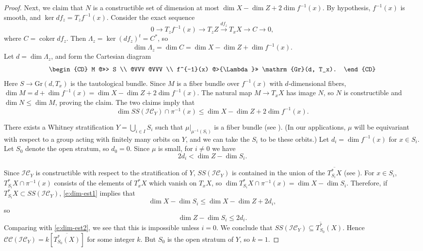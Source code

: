 \documentclass[11pt,letterpaper,reqno]{amsart}
\newcommand{\coker}{\operatorname{coker}}
\newcommand{\cC}{\mathcal C}
\newcommand{\cI}{\mathcal I}
\newcommand{\IC}{\cI \cC}
\newcommand{\CC}{\cC \cC}
\numberwithin{equation}{section}
\theoremstyle{plain}
\theoremstyle{definition}
\theoremstyle{remark}
\begin{document}
\begin{proof}
Next, we claim that  $N$ is a constructible set of dimension at most
$ \dim X - \dim Z + 2 \dim f^{-1}(x)$. 
By hypothesis, $f^{-1}(x)$ is smooth, and $\ker df_z = T_z f^{-1}(x)$.  Consider the exact sequence
$$
0 \rightarrow  T_z f^{-1}(x) \rightarrow T_z Z \stackrel{df_z}{\rightarrow} T_x X \rightarrow C \rightarrow 0,
$$
where $C = \coker df_z$.  Then $\Lambda_z = \ker (df_z)^t = C^*$, so
$$
\dim \Lambda_z = \dim C = \dim X - \dim Z + \dim f^{-1}(x).
$$
Let $d = \dim \Lambda_z$, and
form the Cartesian diagram
$$
\begin{CD}
M  @>>> S \\
@VVV @VVV \\
f^{-1}(x) @>{\Lambda}>> \mathrm{Gr}(d, T_x).
\end{CD}
$$
Here $S \to  \mathrm{Gr}(d, T_x)$ is the tautological bundle.  Since
$M$ is a fiber bundle over $f^{-1}(x)$ with $d$-dimensional fibers, 
$\dim M = d+ \dim f^{-1}(x) = \dim X - \dim Z + 2 \dim f^{-1}(x)$.  The natural map $M \to T_x X$ has image $N$,
so $N$ is constructible and $\dim N \leq \dim M$, proving the claim. 
The two claims imply that
\begin{equation} \label{e:dim-est1}
\dim SS(\IC_Y) \cap \pi^{-1}(x) \leq \dim X - \dim Z + 2 \dim f^{-1}(x).
\end{equation}

There exists a Whitney stratification $Y = \bigcup_{i \in I} S_i$ such that
$\mu |_{\mu^{-1}(S_i)}$ is a fiber bundle (see \cite[Sections 1.6-1.7]{GoreskyMacPherson1988}).  (In our applications, $\mu$ will be equivariant with respect
to a group acting with finitely many orbits on $Y$, and we can take the $S_i$ to be these orbits.)
Let $d_i = \dim f^{-1}(x)$ for $x \in S_i$.  Let $S_0$ denote the open stratum, so $d_0 = 0$.  Since
$\mu$ is small, for $i \neq 0$ we have
\begin{equation} \label{e:dim-est2}
2 d_i < \dim Z - \dim S_i.
\end{equation}

Since $\IC_Y$ is constructible with respect to the stratification of $Y$,
 $SS(\IC_Y)$ is contained in the union of the $\overline{T^*_{S_i} X}$ (see
\cite[Prop.~8.4.1]{KS}).  For $x \in S_i$, $T^*_{S_i} X \cap \pi^{-1}(x)$ consists of the
elements of $T_x^* X$ which vanish on $T_x X$, so
$\dim T^*_{S_i} X \cap \pi^{-1}(x) = \dim X - \dim S_i$.  
Therefore, if $T^*_{S_i} X \subset SS(\IC_Y)$,
\eqref{e:dim-est1} implies that
$$
\dim X - \dim S_i \leq \dim X - \dim Z + 2 d_i,
$$
so
$$
\dim Z - \dim S_i \leq 2 d_i.
$$
Comparing with \eqref{e:dim-est2}, we see that this is impossible unless $i = 0$.  We conclude
that $SS(\IC_Y) \subseteq \overline{T^*_{S_0}}(X)$.  Hence $\CC(\IC_Y) = k [\overline{T^*_{S_0}(X)} ]$ for some integer
$k$.  But $S_0$ is the open stratum of $Y$, so $k = 1$.  
\end{proof}
\end{document}
